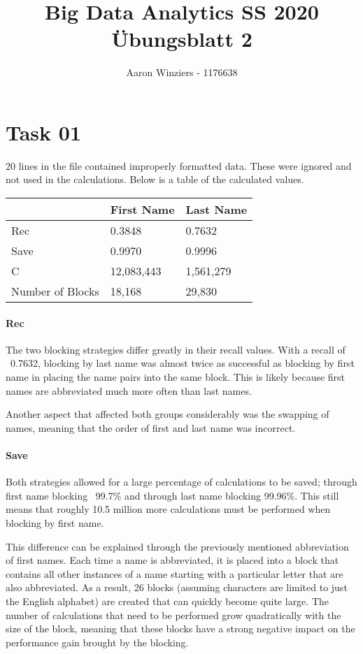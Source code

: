 \documentclass[11pt,a4paper,parskip=half ]{scrartcl}
\author{Aaron Winziers - 1176638}
\title{Big Data Analytics SS 2020\\\LARGE{Übungsblatt 2}}
\begin{document}
	\maketitle
	
\section*{Task 01}
20 lines in the file contained improperly formatted data. These were ignored and not used in the calculations. Below is a table of the calculated values.
\begin{table}[h]
	\centering
	\begin{tabular}{l||l|l}
		& First Name & Last Name \\ \hline \hline
		Rec              & 0.3848     & 0.7632    \\ \hline
		Save             & 0.9970     & 0.9996    \\ \hline
		C                & 12,083,443 & 1,561,279 \\ \hline
		Number of Blocks & 18,168     & 29,830    \\
	\end{tabular}
\end{table}

\paragraph{Rec}
The two blocking strategies differ greatly in their recall values. With a recall of ~0.7632, blocking by last name was almost twice as successful as blocking by first name in placing the name pairs into the same block. This is likely because first names are abbreviated much more often than last names. 

Another aspect that affected both groups considerably was the swapping of names, meaning that the order of first and last name was incorrect. 

\paragraph{Save}
Both strategies allowed for a large percentage of calculations to be saved; through first name blocking ~99.7\% and through last name blocking 99.96\%. This still means that roughly 10.5 million more calculations must be performed when blocking by first name.

This difference can be explained through the previously mentioned abbreviation of first names. Each time a name is abbreviated, it is placed into a block that contains all other instances of a name starting with a particular letter that are also abbreviated. As a result, 26 blocks (assuming characters are limited to just the English alphabet) are created that can quickly become quite large. The number of calculations that need to be performed grow quadratically with the size of the block, meaning that these blocks have a strong negative impact on the performance gain brought by the blocking.

	
	
\end{document}
